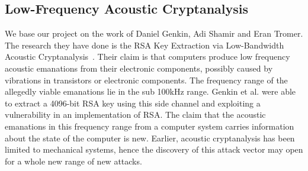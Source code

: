 \subsection{Low-Frequency Acoustic Cryptanalysis}\label{chp2:subsec:original_research}
We base our project on the work of Daniel Genkin, Adi Shamir and Eran Tromer.
The research they have done is the RSA Key Extraction via Low-Bandwidth Acoustic Cryptanalysis~\cite{DBLP:conf/crypto/GenkinST14}.
Their claim is that computers produce low frequency acoustic emanations from their electronic components, possibly caused by vibrations in transistors or electronic components.
The frequency range of the allegedly viable emanations lie in the sub 100kHz range.
Genkin et al. were able to extract a 4096-bit RSA key using this side channel and exploiting a vulnerability in an implementation of RSA.
The claim that the acoustic emanations in this frequency range from a computer system carries information about the state of the computer is new.
Earlier, acoustic cryptanalysis has been limited to mechanical systems, hence the discovery of this attack vector may open for a whole new range of new attacks.
